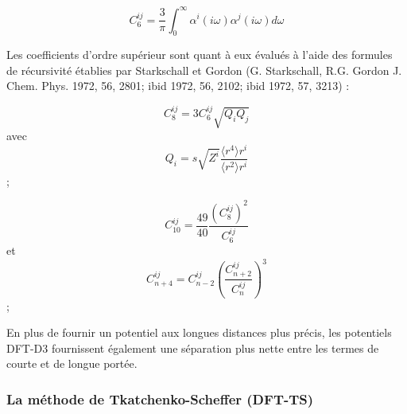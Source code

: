 \documentclass[12pt,a4paper]{book}
\begin{document}
{	\bigskip
	\begin{equation}
	C_{6}^{ij} = \frac{3}{\pi}\int_{0}^{\infty} \alpha^{i} (i\omega) \alpha^{j} (i\omega) d\omega
	\end{equation}
	\bigskip
	
	Les coefficients d’ordre supérieur sont quant à eux évalués à l’aide des formules de récursivité établies par Starkschall et Gordon (G. Starkschall, R.G. Gordon J. Chem. Phys. 1972, 56, 2801; ibid 1972, 56, 2102; ibid 1972, 57, 3213) : 
	
	\begin{multicols}{2}
		\begin{equation}{C}_{8}^{ij} = 3{C}_{6}^{ij}\sqrt {{Q}_{i}{Q}_{j}}\end{equation} avec
		\begin{equation}Q_{i} = s\sqrt{Z^{i}} \frac{\langle r^{4}\rangle r^{i}}{\langle r^{2}\rangle r^{i}}\end{equation}; 
	\end{multicols}
	
	\begin{multicols}{2}
		\begin{equation} {C}_{10}^{ij}=\frac {49}{40} \frac{{\left({C}_{8}^{ij} \right)}^{2}}{{C}_{6}^{ij}} \end{equation} et
		\begin{equation} {C}_{n+4}^{ij}={C}_{n-2}^{ij}{\left(\frac{ {C}_{n+2}^{ij} }{ {C}_{n}^{ij} }\right)}^{3} \end{equation}; 
	\end{multicols}
	
	En plus de fournir un potentiel aux longues distances plus précis, les potentiels DFT-D3 fournissent également une séparation plus nette entre les termes de courte et de longue portée. 
	
	
	\subsubsection{La méthode de Tkatchenko-Scheffer (DFT-TS)}
	
}
\end{document}
